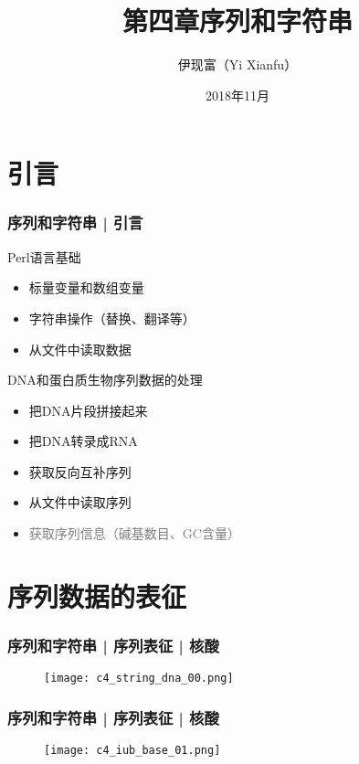 


\title[序列和字符串]{第四章\quad 序列和字符串}
\author[Yixf]{伊现富（Yi Xianfu）}
\date{2018年11月}




\section{引言}
\begin{frame}
  \frametitle{序列和字符串 | 引言}
  \begin{block}{Perl语言基础}
    \begin{itemize}
      \item 标量变量和数组变量
      \item 字符串操作（替换、翻译等）
      \item 从文件中读取数据
    \end{itemize}
  \end{block}
  \pause
  \begin{block}{DNA和蛋白质生物序列数据的处理}
    \begin{itemize}
      \item 把DNA片段拼接起来
      \item 把DNA转录成RNA
      \item 获取反向互补序列
      \item 从文件中读取序列
      \item \textcolor{gray}{获取序列信息（碱基数目、GC含量）}
    \end{itemize}
  \end{block}
\end{frame}

\section{序列数据的表征}
\begin{frame}
  \frametitle{序列和字符串 | 序列表征 | 核酸}
  \begin{figure}
    \centering
    \texttt{[image: c4\_string\_dna\_00.png]}
  \end{figure}
\end{frame}

\begin{frame}
  \frametitle{序列和字符串 | 序列表征 | 核酸}
  \begin{figure}
    \centering
    \texttt{[image: c4\_iub\_base\_01.png]}
  \end{figure}
\end{frame}

